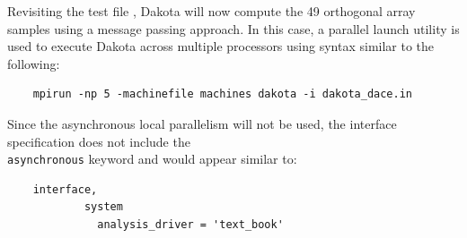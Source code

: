 Revisiting the test file , Dakota will now
compute the 49 orthogonal array samples using a message passing
approach.  In this case, a parallel launch utility is used to execute
Dakota across multiple processors using syntax similar to the following:
\begin{small}
\begin{verbatim}
    mpirun -np 5 -machinefile machines dakota -i dakota_dace.in
\end{verbatim}
\end{small}

Since the asynchronous local parallelism will not be used, the
interface specification does not include the\\ \texttt{asynchronous}
keyword and would appear similar to:
\begin{small}
\begin{verbatim}
    interface,
            system
              analysis_driver = 'text_book'
\end{verbatim}
\end{small}


